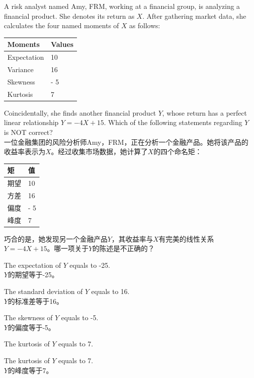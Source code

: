 \documentclass{article}
\newcounter{question} %
\begin{document}
\begin{question}
    A risk analyst named Amy, FRM, working at a financial group, is analyzing a financial product. She denotes its return as \(X\). After gathering market data, she calculates the four named moments of \(X\) as follows:
    \begin{center}
    \begin{tabular}{|l|l|}
    \hline
    Moments & Values \\
    \hline
    Expectation & 10 \\
    \hline
    Variance & 16 \\
    \hline
    Skewness & - 5 \\
    \hline
    Kurtosis & 7 \\
    \hline
    \end{tabular}
    \end{center}
    Coincidentally, she finds another financial product \(Y\), whose return has a perfect linear relationship \(Y = - 4X+15\). Which of the following statements regarding \(Y\) is NOT correct?\\
    一位金融集团的风险分析师Amy，FRM，正在分析一个金融产品。她将该产品的收益率表示为\(X\)。经过收集市场数据，她计算了\(X\)的四个命名矩：
    \begin{center}
    \begin{tabular}{|l|l|}
    \hline
    矩 & 值 \\
    \hline
    期望 & 10 \\
    \hline
    方差 & 16 \\
    \hline
    偏度 & - 5 \\
    \hline
    峰度 & 7 \\
    \hline
    \end{tabular}
    \end{center}
    巧合的是，她发现另一个金融产品\(Y\)，其收益率与\(X\)有完美的线性关系\(Y = - 4X+15\)。哪一项关于\(Y\)的陈述是不正确的？
    \end{question}
    
    \begin{choices}
        \item The expectation of \(Y\) equals to -25.\\
        \(Y\)的期望等于-25。
        \item The standard deviation of \(Y\) equals to 16.\\
        \(Y\)的标准差等于16。
        \item The skewness of \(Y\) equals to -5.\\
        \(Y\)的偏度等于-5。
        \item The kurtosis of \(Y\) equals to 7.
        \item The kurtosis of \(Y\) equals to 7.\\
        \(Y\)的峰度等于7。
    \end{choices}
    
\end{document}
